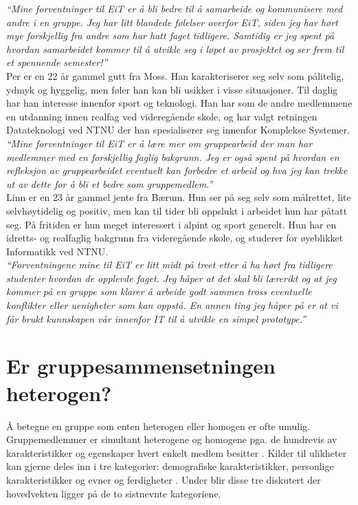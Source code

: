\textit{``Mine forventninger til EiT er å bli bedre til å samarbeide og kommunisere med andre i en gruppe. Jeg har litt blandede følelser overfor EiT, siden jeg har hørt mye forskjellig fra andre som har hatt faget tidligere. Samtidig er jeg spent på hvordan samarbeidet kommer til å utvikle seg i løpet av prosjektet og ser frem til et spennende semester!''}\\

Per er en 22 år gammel gutt fra Moss. Han karakteriserer seg selv som pålitelig, ydmyk og hyggelig, men føler han kan bli usikker i visse situasjoner. Til daglig har han interesse innenfor sport og teknologi. Han har som de andre medlemmene en utdanning innen realfag ved videregående skole, og har valgt retningen Datateknologi ved NTNU der han spesialiserer seg innenfor Komplekse Systemer.\\

\textit{``Mine forventninger til EiT er å lære mer om gruppearbeid der man har medlemmer med en forskjellig faglig bakgrunn. Jeg er også spent på hvordan en refleksjon av gruppearbeidet eventuelt kan forbedre et arbeid og hva jeg kan trekke ut av dette for å bli et bedre som gruppemedlem.''}\\

Linn er en 23 år gammel jente fra Bærum. Hun ser på seg selv som målrettet, lite selvhøytidelig og positiv, men kan til tider bli oppslukt i arbeidet hun har påtatt seg. På fritiden er hun meget interessert i alpint og sport generelt. Hun har en idretts- og realfaglig bakgrunn fra videregående skole, og studerer for øyeblikket Informatikk ved NTNU.\\

\textit{``Forventningene mine til EiT er litt midt på treet etter å ha hørt fra tidligere studenter hvordan de opplevde faget. Jeg håper at det skal bli lærerikt og at jeg kommer på en gruppe som klarer å arbeide godt sammen tross eventuelle konflikter eller uenigheter som kan oppstå. En annen ting jeg håper på er at vi får brukt kunnskapen vår innenfor IT til å utvikle en simpel prototype.''}\\

\section{Er gruppesammensetningen heterogen?}
\label{sec:gruppesammensetning}
Å betegne en gruppe som enten heterogen eller homogen er ofte umulig. Gruppemedlemmer er simultant heterogene og homogene pga. de hundrevis av karakteristikker og egenskaper hvert enkelt medlem besitter \citep{gruppeteori}. Kilder til ulikheter kan gjerne deles inn i tre kategorier: demografiske karakteristikker, personlige karakteristikker og evner og ferdigheter \citep{gruppeteori}. Under blir disse tre diskutert der hovedvekten ligger på de to sistnevnte kategoriene.\\

